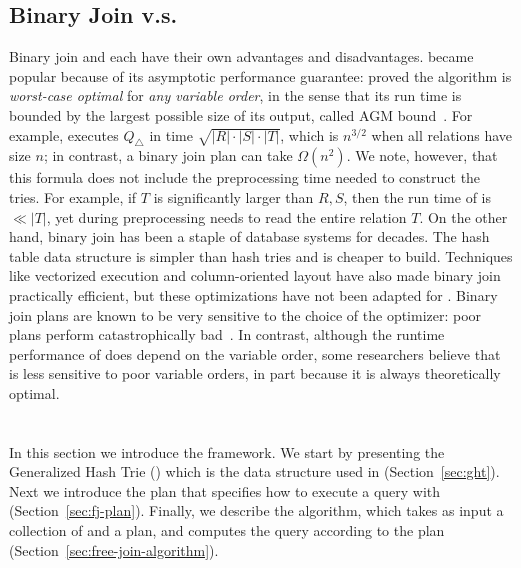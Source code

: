 
\subsection{Binary Join v.s. \GJ}
Binary join and \GJ each have their own advantages and disadvantages.
\GJ became popular because of its asymptotic performance guarantee:
\cite{DBLP:journals/sigmod/NgoRR13} proved the algorithm is
\emph{worst-case optimal} for \emph{any variable order}, in the sense
that its run time is bounded by the largest possible size of its
output, called AGM bound~\cite{DBLP:journals/siamcomp/AtseriasGM13}.
For example, \GJ executes $Q_\triangle$ in time
$\sqrt{|R|\cdot |S| \cdot |T|}$, which is $n^{3/2}$ when all relations
have size $n$; in contrast, a binary join plan can take $\Omega(n^2)$.
We note, however, that this formula does not include the preprocessing
time needed to construct the tries.  For example, if $T$ is
significantly larger than $R, S$, then the run time of \GJ is
$\ll |T|$, yet during preprocessing \GJ needs to read the entire
relation $T$.  On the other hand, binary join has been a staple of
database systems for decades.  The hash table data structure is
simpler than hash tries and is cheaper to build.  Techniques like
vectorized execution and column-oriented layout have also made binary
join practically efficient, but these optimizations have not been
adapted for \GJ.  Binary join plans are known to be very sensitive to
the choice of the optimizer: poor plans perform catastrophically
bad~\cite{DBLP:journals/pvldb/LeisGMBK015}.  In contrast, although the
runtime performance of \GJ does depend on the variable order, some
researchers believe that \GJ is less sensitive to poor variable
orders, in part because it is always theoretically optimal.

\section{\FJ}\label{sec:free-join}

In this section we introduce the \FJ framework.
We start by presenting the Generalized Hash Trie (\GHT) which
 is the data structure used in \FJ (Section~\ref{sec:ght}).
Next we introduce the \FJ plan that specifies 
  how to execute a query with \FJ (Section~\ref{sec:fj-plan}).
Finally, we describe the \FJ algorithm, 
  which takes as input a collection of \GHTs 
  and a \FJ plan,
  and computes the query according to the plan (Section~\ref{sec:free-join-algorithm}).
  
